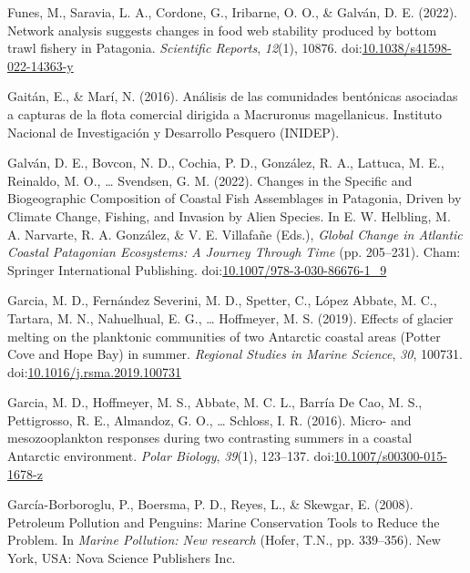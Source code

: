 \documentclass[
]{article}
\newlength{\cslhangindent}
\newlength{\cslentryspacingunit} %
\newenvironment{CSLReferences}[2] %
 {%
  \setlength{\parindent}{0pt}
  \ifodd #1
  \let\oldpar\par
  \def\par{\hangindent=\cslhangindent\oldpar}
  \fi
  \setlength{\parskip}{#2\cslentryspacingunit}
 }%
 {}
\begin{document}
\begin{CSLReferences}{1}{0}
\leavevmode{}%
Funes, M., Saravia, L. A., Cordone, G., Iribarne, O. O., \& Galván, D.
E. (2022). Network analysis suggests changes in food web stability
produced by bottom trawl fishery in {Patagonia}. \emph{Scientific
Reports}, \emph{12}(1), 10876.
doi:\href{https://doi.org/10.1038/s41598-022-14363-y}{10.1038/s41598-022-14363-y}

\leavevmode{}%
Gaitán, E., \& Marí, N. (2016). {Análisis de las comunidades bentónicas
asociadas a capturas de la flota comercial dirigida a Macruronus
magellanicus}. {Instituto Nacional de Investigación y Desarrollo
Pesquero (INIDEP)}.

\leavevmode{}%
Galván, D. E., Bovcon, N. D., Cochia, P. D., González, R. A., Lattuca,
M. E., Reinaldo, M. O., \ldots{} Svendsen, G. M. (2022). Changes in the
{Specific} and {Biogeographic Composition} of {Coastal Fish Assemblages}
in {Patagonia}, {Driven} by {Climate Change}, {Fishing}, and {Invasion}
by {Alien Species}. In E. W. Helbling, M. A. Narvarte, R. A. González,
\& V. E. Villafañe (Eds.), \emph{Global {Change} in {Atlantic Coastal
Patagonian Ecosystems}: {A Journey Through Time}} (pp. 205--231).
{Cham}: {Springer International Publishing}.
doi:\href{https://doi.org/10.1007/978-3-030-86676-1_9}{10.1007/978-3-030-86676-1\_9}

\leavevmode{}%
Garcia, M. D., Fernández Severini, M. D., Spetter, C., López Abbate, M.
C., Tartara, M. N., Nahuelhual, E. G., \ldots{} Hoffmeyer, M. S. (2019).
Effects of glacier melting on the planktonic communities of two
{Antarctic} coastal areas ({Potter Cove} and {Hope Bay}) in summer.
\emph{Regional Studies in Marine Science}, \emph{30}, 100731.
doi:\href{https://doi.org/10.1016/j.rsma.2019.100731}{10.1016/j.rsma.2019.100731}

\leavevmode{}%
Garcia, M. D., Hoffmeyer, M. S., Abbate, M. C. L., Barría De Cao, M. S.,
Pettigrosso, R. E., Almandoz, G. O., \ldots{} Schloss, I. R. (2016).
Micro- and mesozooplankton responses during two contrasting summers in a
coastal {Antarctic} environment. \emph{Polar Biology}, \emph{39}(1),
123--137.
doi:\href{https://doi.org/10.1007/s00300-015-1678-z}{10.1007/s00300-015-1678-z}

\leavevmode{}%
García-Borboroglu, P., Boersma, P. D., Reyes, L., \& Skewgar, E. (2008).
Petroleum {Pollution} and {Penguins}: {Marine Conservation Tools} to
{Reduce} the {Problem}. In \emph{Marine {Pollution}: {New} research}
(Hofer, T.N., pp. 339--356). {New York, USA}: {Nova Science Publishers
Inc.}


\end{CSLReferences}
\end{document}
